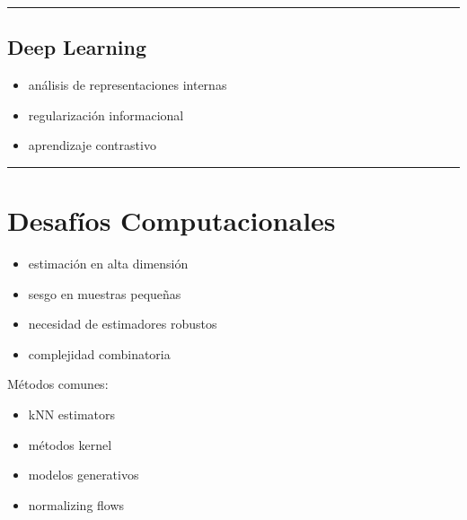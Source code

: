 \documentclass[letterpaper,10pt,english]{jupyterBook}
\begin{document}
\bigskip\hrule\bigskip



\subsection{Deep Learning}
\label{\detokenize{03_multivariate_models/conditional_mi:deep-learning}}\begin{itemize}
\item {} 
\sphinxAtStartPar
análisis de representaciones internas

\item {} 
\sphinxAtStartPar
regularización informacional

\item {} 
\sphinxAtStartPar
aprendizaje contrastivo

\end{itemize}


\bigskip\hrule\bigskip



\section{Desafíos Computacionales}
\label{\detokenize{03_multivariate_models/conditional_mi:desafios-computacionales}}\begin{itemize}
\item {} 
\sphinxAtStartPar
estimación en alta dimensión

\item {} 
\sphinxAtStartPar
sesgo en muestras pequeñas

\item {} 
\sphinxAtStartPar
necesidad de estimadores robustos

\item {} 
\sphinxAtStartPar
complejidad combinatoria

\end{itemize}

\sphinxAtStartPar
Métodos comunes:
\begin{itemize}
\item {} 
\sphinxAtStartPar
k\sphinxhyphen{}NN estimators

\item {} 
\sphinxAtStartPar
métodos kernel

\item {} 
\sphinxAtStartPar
modelos generativos

\item {} 
\sphinxAtStartPar
normalizing flows

\end{itemize}
\end{document}
